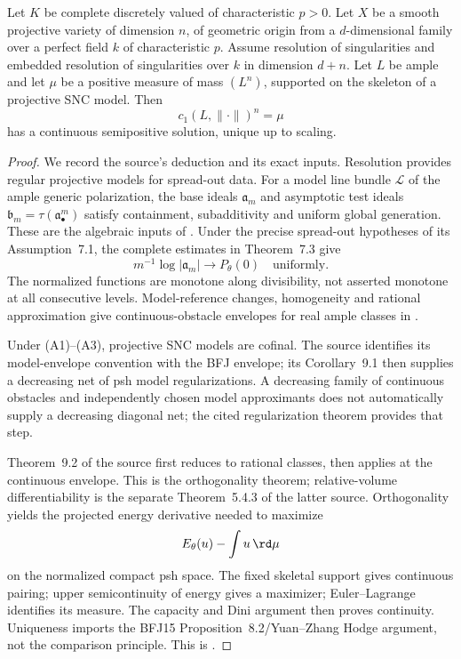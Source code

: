 \begin{theorem}\label{thm:gjkm-positive-characteristic-cy}
Let $K$ be complete discretely valued of characteristic $p>0$.  Let
$X$ be a smooth projective variety of dimension $n$, of geometric origin
from a $d$-dimensional family over a perfect field $k$ of characteristic
$p$.  Assume resolution of singularities and embedded resolution of
singularities over $k$ in dimension $d+n$.  Let $L$ be ample and let
$\mu$ be a positive measure of mass $(L^n)$, supported on the skeleton
of a projective SNC model.  Then
\[
                    c_1(L,\|\cdot\|)^n=\mu
\]
has a continuous semipositive solution, unique up to scaling.
\end{theorem}
\begin{proof}
We record the source's deduction and its exact inputs.  Resolution
provides regular projective models for spread-out data.  For a model
line bundle $\mathcal L$ of the ample generic polarization, the base
ideals $\mathfrak a_m$ and asymptotic test ideals
$\mathfrak b_m=\tau(\mathfrak a_\bullet^m)$ satisfy containment,
subadditivity and uniform global generation.  These are the algebraic
inputs of \cite[Theorem~1.3 and Theorem~4.6]{GJKM19}.  Under the precise
spread-out hypotheses of its Assumption~7.1, the complete estimates in
Theorem~7.3 give
\[
       m^{-1}\log|\mathfrak a_m|\longrightarrow P_\theta(0)
       \quad\text{uniformly}.
\]
The normalized functions are monotone along divisibility, not asserted
monotone at all consecutive levels.  Model-reference changes,
homogeneity and rational approximation give continuous-obstacle envelopes
for real ample classes in \cite[Theorem~8.2]{GJKM19}.

Under \textup{(A1)}--\textup{(A3)}, projective SNC models are cofinal.
The source identifies its model-envelope convention with the BFJ
envelope; its Corollary~9.1 then supplies a decreasing net of psh model
regularizations.  A decreasing family of continuous obstacles and
independently chosen model approximants does not automatically supply
a decreasing diagonal net; the cited regularization theorem provides
that step.

Theorem~9.2 of the source first reduces to rational classes, then applies
\cite[Theorem~6.3.2]{BGGJKM20} at the continuous envelope.  This is the
orthogonality theorem; relative-volume differentiability is the separate
Theorem~5.4.3 of the latter source.  Orthogonality yields the projected
energy derivative needed to maximize
\[
                 E_\theta(u)-\int u\,\rd\mu
\]
on the normalized compact psh space.  The fixed skeletal support gives
continuous pairing; upper semicontinuity of energy gives a maximizer;
Euler--Lagrange identifies its measure.  The capacity and Dini argument
then proves continuity.  Uniqueness imports the BFJ15
Proposition~8.2/Yuan--Zhang Hodge argument, not the comparison principle.
This is \cite[Theorem~9.3 and its proof]{GJKM19}.
\end{proof}

